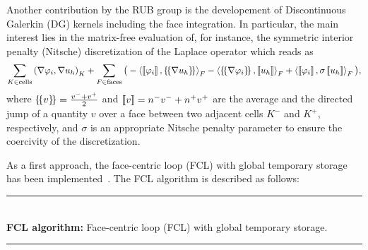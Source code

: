 \documentclass[a4paper,12pt]{article}
\begin{document}
Another contribution by the RUB group is the developement of Discontinuous Galer\-kin (DG) kernels including the face integration. In particular, the main interest lies in the matrix-free evaluation of, for instance,  the symmetric interior penalty (Nitsche) discretization of the Laplace operator which reads as
\[
\sum\limits_{K \in \text{cells}} \left(\nabla \varphi_i, \nabla u_h \right)_{K} + \sum\limits_{F \in \text{faces}} \big( -\left< \jump{\varphi_i}, \average{\nabla u_h} \right>_{F} - \left< \average{\nabla \varphi_i}, \jump{u_h}\right>_F  + \left< \jump{\varphi_i}, \sigma \jump{u_h}\right>_F \big),
\]
where $\left\{\!\left\{v\right\}\!\right\} = \frac{v^{-}+v^{+}}{2}$ and $\left[\!\left[{v}\right]\!\right] = n^{-}v^{-}+n^{+}v^{+}$ are the average and the directed jump of a quantity $v$ over a face between two adjacent cells $K^{-}$ and $K^{+}$, respectively, and $\sigma$ is an appropriate Nitsche penalty parameter to ensure the coercivity of the discretization.



As a first approach, the face-centric loop (FCL) with global temporary storage has been implemented~\citep{KronbichlerAllalen2018, KronbichlerKormann2019}. The FCL algorithm is described as follows:

\noindent\rule{\textwidth}{1pt}\\[-0.5em]
\textbf{FCL algorithm:} Face-centric loop (FCL) with global temporary storage.\\[-0.5em]
\rule{\textwidth}{0.6pt}
\end{document}
